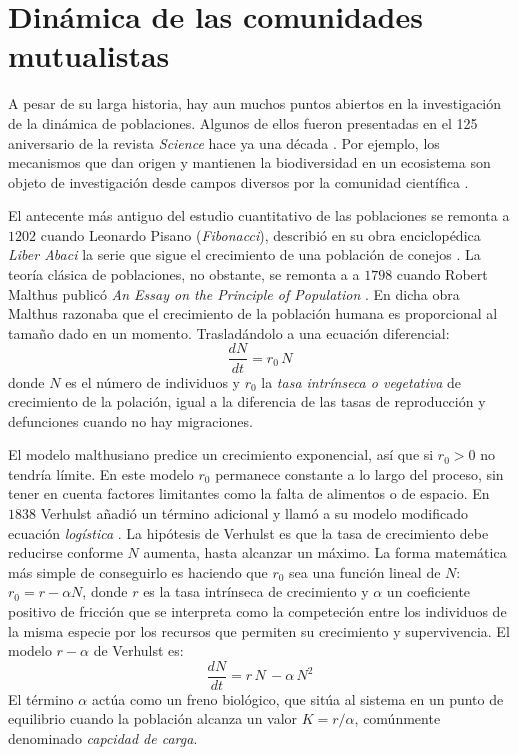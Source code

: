 \section{Dinámica de las comunidades mutualistas}

A pesar de su larga historia, hay aun muchos puntos abiertos en la investigación de la dinámica de poblaciones. Algunos de ellos fueron presentadas en el 125 aniversario de la revista {\em Science} hace ya una década  \cite{kennedy2005,pennisi2005,stokstad2005}. Por ejemplo, los mecanismos que dan origen y mantienen la biodiversidad en un ecosistema son objeto de investigación desde campos diversos por la comunidad científica \cite{williams2000,dunne2002biodiversity,olesen2007modularity,allesina2008,bascompte2009,saavedra2009,bastolla2009,fortuna2010nestedness,encinas2012}.  

El antecente más antiguo del estudio cuantitativo de las poblaciones se remonta a $1202$ cuando Leonardo Pisano (\textit{Fibonacci}), describió en su obra enciclopédica {\em Liber Abaci} la serie que sigue el crecimiento de una población de conejos \cite{sigler2002}. La teoría clásica de poblaciones, no obstante, se remonta a a $1798$ cuando Robert Malthus publicó {\em An Essay on the Principle of Population} \citep{malthus1798}. En dicha obra Malthus razonaba que el crecimiento de la población humana es proporcional al tamaño dado en un momento. Trasladándolo a una ecuación diferencial:
\begin{equation}
\frac{dN}{dt}=r_0\, N 
\label{eq:malthus}
\end{equation}
\noindent donde $N$ es el número de individuos y $r_0$ la {\em tasa intrínseca o vegetativa} de crecimiento de la polación, igual a la diferencia de las tasas de reproducción y defunciones cuando no hay migraciones.

El modelo malthusiano predice un crecimiento exponencial, así que si $r_0 > 0$ no tendría límite. En este modelo $r_0$ permanece constante a lo largo del proceso, sin tener en cuenta factores limitantes como la falta de alimentos o de espacio. En $1838$ Verhulst añadió un término adicional y llamó a su modelo modificado ecuación \emph{logística} \cite{verhulst1845}. La hipótesis de Verhulst es que la tasa de crecimiento debe reducirse conforme $N$ aumenta, hasta alcanzar un máximo. La forma matemática más simple de conseguirlo es haciendo que $r_0$ sea una función lineal de $N$: $ r_0 = r - \alpha N$, donde $r$ es la tasa intrínseca de crecimiento y $\alpha$ un coeficiente positivo de fricción que se interpreta como la competeción entre los individuos de la misma especie por los recursos que permiten su crecimiento y supervivencia. El modelo $r-\alpha$ de Verhulst es:
\begin{equation}
\frac{dN}{dt}=r \, N \,  - \alpha  \, N^2 
\label{eq:primitiveverhulst}
\end{equation}
El término $\alpha$ actúa como un freno biológico, que sitúa al sistema en un punto de equilibrio cuando la población alcanza un valor $ K = r / \alpha$, comúnmente denominado \emph{capcidad de carga}.

